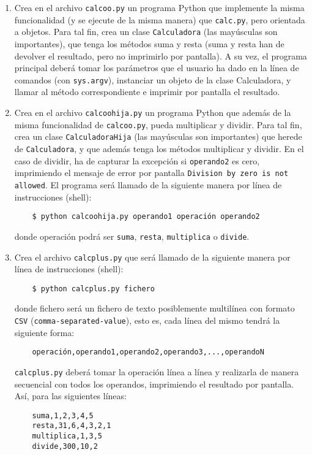\documentclass[11pt,a4paper]{article}
\newcommand{\finejercicio}{
  \begin{footnotesize}
    [Al terminar el ejercicio es recomendable hacer \texttt{commit} de los ficheros modificados]
  \end{footnotesize}
}
\renewcommand{\finejercicio}{
}
\begin{document}
\begin{enumerate}
\finejercicio

  \item Crea en el archivo \texttt{calcoo.py} un programa Python que implemente la misma funcionalidad (y se ejecute de la misma manera) que \texttt{calc.py}, pero orientada a objetos. Para tal fin, crea un clase \texttt{Calculadora} (las mayúsculas son importantes), que tenga los métodos suma y resta (suma y resta han de devolver el resultado, pero no imprimirlo por pantalla). A su vez, el programa principal deberá tomar los parámetros que el usuario ha dado en la línea de comandos (con \texttt{sys.argv}), instanciar un objeto de la clase Calculadora, y llamar al método correspondiente e imprimir por pantalla el resultado.

\finejercicio

  \item Crea en el archivo \texttt{calcoohija.py} un programa Python que además de la misma funcionalidad de \texttt{calcoo.py}, pueda multiplicar y dividir. Para tal fin, crea un clase \texttt{CalculadoraHija} (las mayúsculas son importantes) que herede de \texttt{Calculadora}, y que además tenga los métodos multiplicar y dividir. En el caso de dividir, ha de capturar la excepción si \texttt{operando2} es cero, imprimiendo el mensaje de error por pantalla \texttt{Division by zero is not allowed}.
El programa será llamado de la siguiente manera por línea de instrucciones (shell):
    \begin{verbatim}
    $ python calcoohija.py operando1 operación operando2
    \end{verbatim}
donde operación podrá ser \texttt{suma}, \texttt{resta}, \texttt{multiplica} o \texttt{divide}.

\finejercicio

  \item Crea el archivo \texttt{calcplus.py} que será llamado de la siguiente manera por línea de instrucciones (shell):
    \begin{verbatim}
    $ python calcplus.py fichero
    \end{verbatim}
donde fichero será un fichero de texto posiblemente multilínea con formato \texttt{CSV} (\texttt{comma-separated-value}), esto es, cada línea del mismo tendrá la siguiente forma:
    \begin{verbatim}
    operación,operando1,operando2,operando3,...,operandoN
    \end{verbatim}

	\texttt{calcplus.py} deberá tomar la operación línea a línea y realizarla de manera secuencial con todos los operandos, imprimiendo el resultado por pantalla. Así, para las siguientes líneas:
    \begin{verbatim}
    suma,1,2,3,4,5
    resta,31,6,4,3,2,1
    multiplica,1,3,5
    divide,300,10,2
    \end{verbatim}


\end{enumerate}
\end{document}
